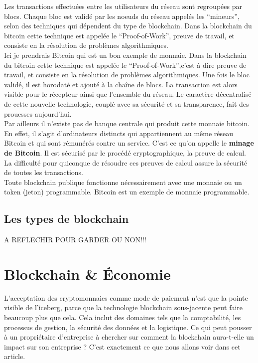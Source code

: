 \documentclass[12pt]{report}
\begin{document}
Les transactions effectuées entre les utilisateurs du réseau sont regroupées par blocs. Chaque bloc est validé par les noeuds du réseau appelés les “mineurs”, selon des techniques qui dépendent du type de blockchain. Dans la blockchain du bitcoin cette technique est appelée le “Proof-of-Work”, preuve de travail, et consiste en la résolution de problèmes algorithmiques.\\


Ici je prendrais Bitcoin qui est un bon exemple de monnaie. Dans la blockchain du bitcoin cette technique est appelée le “Proof-of-Work”,c’est à dire preuve de travail, et consiste en la résolution de problèmes algorithmiques. Une fois le bloc validé, il est horodaté et ajouté à la chaîne de blocs. La transaction est alors visible pour le récepteur ainsi que l’ensemble du réseau. Le caractère décentralisé de cette nouvelle technologie, couplé avec sa sécurité et sa transparence, fait des prouesses aujourd’hui.\\

Par ailleurs il n’existe pas de banque centrale qui produit cette monnaie bitcoin. En effet, il s’agit d’ordinateurs distincts qui appartiennent au même réseau Bitcoin et qui sont rémunérés contre un service. C’est ce qu’on appelle le \textbf{minage de Bitcoin}. Il est sécurisé par le procédé cryptographique, la preuve de calcul. La difficulté pour quiconque de résoudre ces preuves de calcul assure la sécurité de toutes les transactions.\\

Toute blockchain publique fonctionne nécessairement avec une monnaie ou un token (jeton) programmable. Bitcoin est un exemple de monnaie programmable.

	\subsection{Les types de blockchain}
A REFLECHIR POUR GARDER OU NON!!!

\newpage
\section{Blockchain \& Économie}
\hspace{1cm} L'acceptation des cryptomonnaies comme mode de paiement n’est que la pointe visible de l’iceberg, parce que la technologie blockchain sous-jacente peut faire beaucoup plus que cela. Cela inclut des domaines tels que la comptabilité, les processus de gestion, la sécurité des données et la logistique. Ce qui peut pousser à un propriétaire d'entreprise à chercher sur comment la blockchain aura-t-elle un impact sur son entreprise ? C’est exactement ce que nous allons voir dans cet article.
\end{document}
